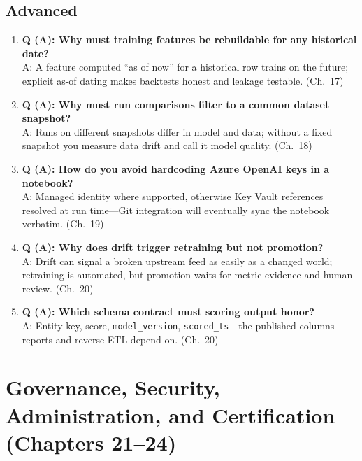\subsection*{Advanced}
\begin{enumerate}
    \item \textbf{Q (A): Why must training features be rebuildable for any historical date?}\\
    A: A feature computed ``as of now'' for a historical row trains on the future; explicit
    as-of dating makes backtests honest and leakage testable. (Ch.~17)
    \item \textbf{Q (A): Why must run comparisons filter to a common dataset snapshot?}\\
    A: Runs on different snapshots differ in model and data; without a fixed snapshot you
    measure data drift and call it model quality. (Ch.~18)
    \item \textbf{Q (A): How do you avoid hardcoding Azure OpenAI keys in a notebook?}\\
    A: Managed identity where supported, otherwise Key Vault references resolved at run
    time---Git integration will eventually sync the notebook verbatim. (Ch.~19)
    \item \textbf{Q (A): Why does drift trigger retraining but not promotion?}\\
    A: Drift can signal a broken upstream feed as easily as a changed world; retraining is
    automated, but promotion waits for metric evidence and human review. (Ch.~20)
    \item \textbf{Q (A): Which schema contract must scoring output honor?}\\
    A: Entity key, score, \texttt{model\_version}, \texttt{scored\_ts}---the published columns
    reports and reverse ETL depend on. (Ch.~20)
\end{enumerate}

\section{Governance, Security, Administration, and Certification (Chapters 21--24)}

